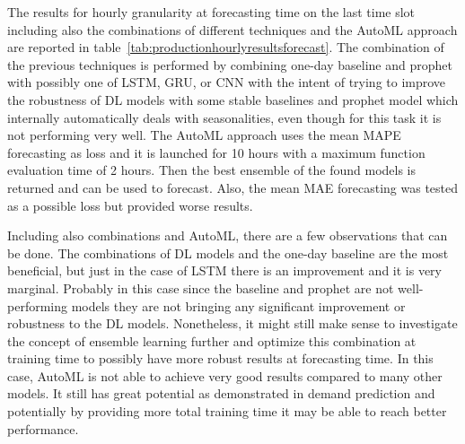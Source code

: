 The results for hourly granularity at forecasting time on the last time slot including also the combinations of different techniques and the AutoML approach are reported in table~\ref{tab:productionhourlyresultsforecast}.
The combination of the previous techniques is performed by combining one-day baseline and prophet with possibly one of LSTM, GRU, or CNN with the intent of trying to improve the robustness of DL models with some stable baselines and prophet model which internally automatically deals with seasonalities, even though for this task it is not performing very well.
The AutoML approach uses the mean MAPE forecasting as loss and it is launched for 10 hours with a maximum function evaluation time of 2 hours.
Then the best ensemble of the found models is returned and can be used to forecast.
Also, the mean MAE forecasting was tested as a possible loss but provided worse results.

Including also combinations and AutoML, there are a few observations that can be done.
The combinations of DL models and the one-day baseline are the most beneficial, but just in the case of LSTM there is an improvement and it is very marginal.
Probably in this case since the baseline and prophet are not well-performing models they are not bringing any significant improvement or robustness to the DL models.
Nonetheless, it might still make sense to investigate the concept of ensemble learning further and optimize this combination at training time to possibly have more robust results at forecasting time.
In this case, AutoML is not able to achieve very good results compared to many other models.
It still has great potential as demonstrated in demand prediction and potentially by providing more total training time it may be able to reach better performance.

